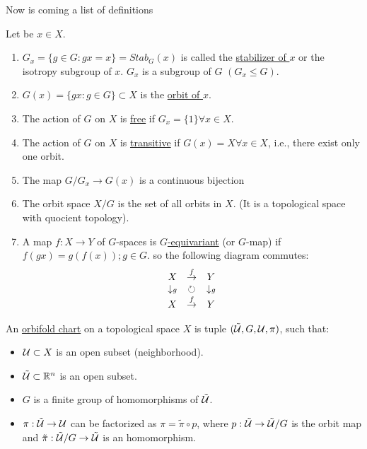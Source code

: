 Now is coming a list of definitions
\begin{defn}
Let be $x\in X$.
\begin{enumerate}
\item $G_x=\{g\in G : gx=x\}=Stab_G(x)$ is called the \underline{stabilizer of $x$} or the isotropy subgroup of $x$. $G_x$ is a subgroup of $G$ $(G_x\leqslant G).$
\item $G(x)=\{gx : g\in G\}\subset X$ is the \underline{orbit of $x$}.
\item The action of $G$ on $X$ is \underline{free} if $G_x=\{ 1\} \forall x\in X.$
\item The action of $G$ on $X$ is \underline{transitive} if $G(x)=X \forall x\in X$, i.e., there exist only one orbit.
\item The map $G/G_x\rightarrow G(x)$ is a continuous bijection
\item The orbit space $X/G$ is the set of all orbits in $X$. (It is a topological space with quocient topology).
\item A map $f:X\rightarrow Y$ of $G$-spaces is \underline{$G$-equivariant} (or $G$-map) if $f(gx)=g(f(x)); g\in G$. so the following diagram commutes:
 $$\begin{array}[c]{ccc}
X&\stackrel{f}{\rightarrow}&Y\\
\downarrow\scriptstyle{g}&\circlearrowright&\downarrow\scriptstyle{g}\\
X&\stackrel{f}{\rightarrow}&Y
\end{array}$$
\end{enumerate}
\end{defn}


\begin{defn}
An \underline{orbifold chart} on a topological space $X$ is tuple $(\tilde{\mathcal{U}},G,\mathcal{U}, \pi)$, such that:
\begin{itemize}
  \item $\mathcal{U}\subset X$ is an open subset (neighborhood).
  \item $\tilde{\mathcal{U}}\subset \mathbb{R}^n$ is an open subset.
  \item $G$ is a finite group of homomorphisms of  $\tilde{\mathcal{U}}$.
  \item $\pi:\tilde{\mathcal{U}}\rightarrow \mathcal{U}$ can be factorized as $\pi=\tilde{\pi}\circ p$, where 
  $p:\tilde{\mathcal{U}}\rightarrow \tilde{\mathcal{U}}/G$ is the orbit map and $\tilde{\pi}:\tilde{\mathcal{U}}/G\rightarrow \tilde{\mathcal{U}}$ is an homomorphism.
\end{itemize}
\end{defn}





